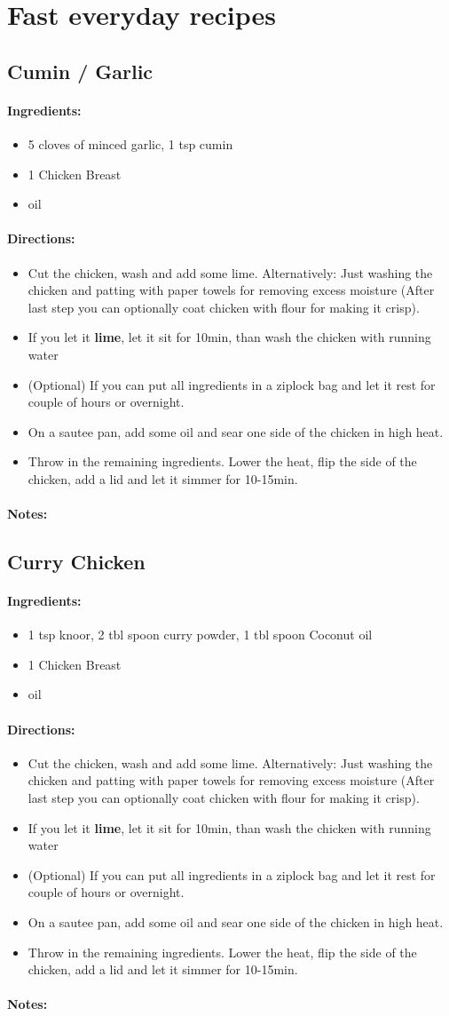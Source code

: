 \documentclass{article}
\begin{document}
\newcommand{\chick}[3]{
\subsection{#1}

\paragraph{Ingredients:}

\begin{itemize}
\item #2
\item 1 Chicken Breast 
\item oil
\end{itemize}

\paragraph{Directions:}
\begin{itemize}
\item Cut the chicken, wash and add some lime. Alternatively: Just washing the chicken and patting with paper towels for removing excess moisture (After last step you can optionally coat chicken with flour for making it crisp).
\item If you let it \textbf{lime}, let it sit for 10min, than wash the chicken with running water
\item (Optional) If you can put all ingredients in a ziplock bag and let it rest for couple of hours or overnight.
\item On a sautee pan, add some oil and sear one side of the chicken in high heat.
\item Throw in the remaining ingredients. Lower the heat, flip the side of the chicken, add a lid and let it simmer for 10-15min.
\end{itemize}

\paragraph{Notes:} #3
}

\section{Fast everyday recipes}

\chick{Cumin / Garlic}{5 cloves of minced garlic, 1 tsp cumin}{}

\chick{Curry Chicken}{1 tsp knoor, 2 tbl spoon curry powder, 1 tbl spoon Coconut oil}{}
\end{document}
